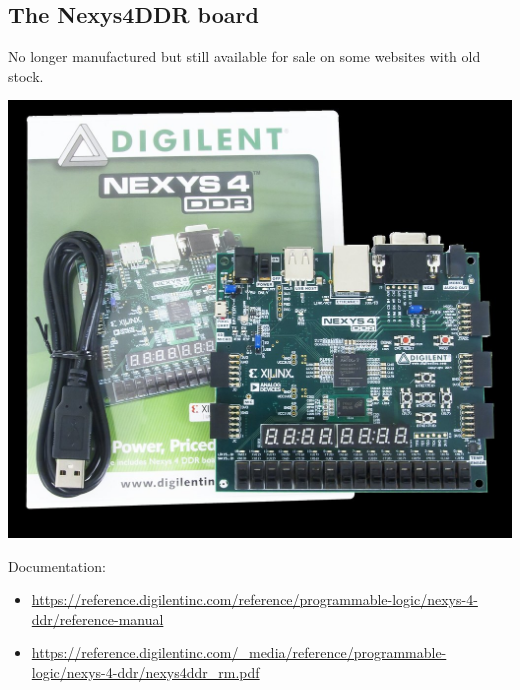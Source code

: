 \begin{minipage}{\linewidth}
  \subsection{The Nexys4DDR board}

  No longer manufactured but still available for sale on some websites with old stock.

  \begin{center}
    \includegraphics[width=0.4\linewidth]{images/img002_nexys4_ddr_board.jpg}
  \end{center}

  Documentation:

  \begin{itemize}
    \item \url{https://reference.digilentinc.com/reference/programmable-logic/nexys-4-ddr/reference-manual}
    \item \url{https://reference.digilentinc.com/\_media/reference/programmable-logic/nexys-4-ddr/nexys4ddr\_rm.pdf}
  \end{itemize}
\end{minipage}

